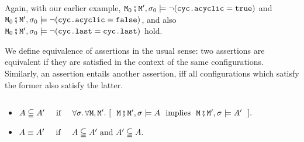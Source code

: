 \noindent
Again, with our earlier example,  
${\mbox{\tt{\ensuremath{{\mbox{\tt{M}}}}}}}_0\fatsemi {\mbox{\tt{\ensuremath{{\mbox{\tt{M}}}}}}}', \sigma_0 \models \neg ({\mbox{\tt{cyc.acyclic}}}={\mbox{\tt{true}}})$    and  
${\mbox{\tt{\ensuremath{{\mbox{\tt{M}}}}}}}_0\fatsemi {\mbox{\tt{\ensuremath{{\mbox{\tt{M}}}}}}}', \sigma_0 \models  \neg ({\mbox{\tt{cyc.acyclic}}}={\mbox{\tt{false}}})$, 
and also 
${\mbox{\tt{\ensuremath{{\mbox{\tt{M}}}}}}}_0\fatsemi {\mbox{\tt{\ensuremath{{\mbox{\tt{M}}}}}}}', \sigma_0 \models  \neg ({\mbox{\tt{cyc.last}}}={\mbox{\tt{cyc.last}}})$
hold.

\label{sect:pl} 
We define equivalence of  assertions in the usual sense: two assertions are equivalent if they are satisfied  in
the context of the same configurations.
Similarly, an assertion entails another assertion, iff all configurations 
which satisfy the former also satisfy the latter.  

\begin{definition}
$ ~ $

\begin{itemize}
\item
$\A \subseteqq \A'\  \IFF\    \forall \sigma.\, \forall \M, \M'. \ [\ \ \M\mkpair \M', \sigma \models \A\ \mbox{ implies }\ \M\mkpair \M', \sigma \models \A'\ \ ].$
\item
$A \equiv A'\  {{\hspace{.1in}} {\mbox{ if }} {\hspace{.1in}}}\     A \subseteqq A' \mbox{ and }  A' \subseteqq A.$
\end{itemize}
\end{definition}



